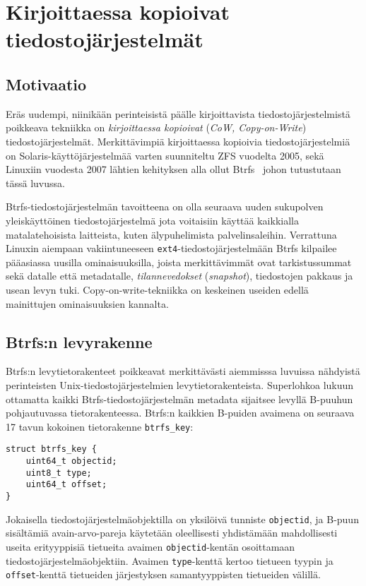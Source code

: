 \section{Kirjoittaessa kopioivat tiedostojärjestelmät}
\label{ChapCopyOnWrite}
\subsection{Motivaatio}
Eräs uudempi, niinikään perinteisistä päälle kirjoittavista tiedostojärjestelmistä poikkeava tekniikka on \emph{kirjoittaessa kopioivat} (\emph{CoW, Copy-on-Write}) tiedostojärjestelmät.
Merkittävimpiä kirjoittaessa kopioivia tiedostojärjestelmiä on Solaris-käyttöjärjestelmää varten suunniteltu ZFS vuodelta 2005,
sekä Linuxiin vuodesta 2007 lähtien kehityksen alla ollut Btrfs~\cite{Btrfs} johon tutustutaan tässä luvussa.

Btrfs-tiedostojärjestelmän tavoitteena on olla seuraava uuden sukupolven yleiskäyttöinen tiedostojärjestelmä jota voitaisiin käyttää kaikkialla matalatehoisista laitteista, kuten älypuhelimista palvelinsaleihin.
Verrattuna Linuxin aiempaan vakiintuneeseen \texttt{ext4}-tiedostojärjestelmään Btrfs kilpailee pääasiassa uusilla ominaisuuksilla,
joista merkittävimmät ovat tarkistussummat sekä datalle että metadatalle, \emph{tilannevedokset} (\emph{snapshot}), tiedostojen pakkaus ja usean levyn tuki.
Copy-on-write-tekniikka on keskeinen useiden edellä mainittujen ominaisuuksien kannalta.

\subsection{Btrfs:n levyrakenne}
Btrfs:n levytietorakenteet poikkeavat merkittävästi aiemmisssa luvuissa nähdyistä perinteisten Unix-tiedosto\-järjestelmien levytietorakenteista.
Superlohkoa lukuun ottamatta kaikki Btrfs-tiedostojärjestelmän metadata sijaitsee levyllä B-puuhun pohjautuvassa tietorakenteessa.
Btrfs:n kaikkien B-puiden avaimena on seuraava 17 tavun kokoinen tietorakenne \texttt{btrfs\_key}:
\begin{verbatim}
struct btrfs_key {
    uint64_t objectid;
    uint8_t type;
    uint64_t offset;
}
\end{verbatim}
Jokaisella tiedostojärjestelmäobjektilla on yksilöivä tunniste \texttt{objectid},
ja B-puun sisältämiä avain-arvo-pareja käytetään oleellisesti yhdistämään mahdollisesti useita erityyppisiä tietueita avaimen \texttt{objectid}-kentän osoittamaan tiedostojärjestelmäobjektiin.
Avaimen \texttt{type}-kenttä kertoo tietueen tyypin ja \texttt{offset}-kenttä tietueiden järjestyksen samantyyppisten tietueiden välillä.

